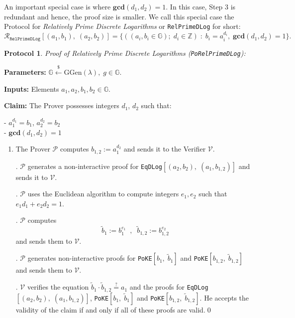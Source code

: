 \documentclass[11pt, lettersize, notitlepage, leqno, footskip=0.6cm]{article}
\newcommand{\bz}{\mathbb Z}
\newcommand{\ttt}{\texttt}
\newcommand{\wti}{\widetilde}
\newcommand{\mc}{\mathcal}
\newcommand{\mb}{\mathbb}
\newcommand{\mbf}{\mathbf}
\newcommand{\mr}{\mathrm}
\newcommand{\lamb}{\lambda}
\newcommand{\mP}{\mc{P}}
\newcommand{\V}{\mc{V}}
\newcommand{\vs}{\vspace{-0.15cm}}
\newcommand{\noin}{\noindent}
\newcommand{\GCD}{\mbf{gcd}}
\newtheorem{Prot}[Thm]{Protocol}
\numberwithin{equation}{section}
\begin{document}
\noindent An important special case is where $\GCD(d_1, d_2) = 1$. In this case, Step 3 is redundant and hence, the proof size is smaller. We call this special case the Protocol for \textit{Relatively Prime Discrete Logarithms} or \verb|RelPrimeDLog| for short: \vs $$\mc{R}_{{\ttt{RelPrimeDLog}}}[(a_1,b_1),\;(a_2,b_2)] = \big\{((a_i, b_i\in\mb{G});\;d_i\in\bz)\;:\; b_i = a_i^{d_i},\;\GCD(d_1,d_2)=1 \big\} .$$ 



\begin{Prot} \normalfont \hypertarget{RP}{\textit{Proof of Relatively Prime Discrete Logarithms}} (\verb|PoRelPrimeDLog|):\end{Prot} \vspace{-0.3cm}

\noindent \textbf{Parameters:} $\mb{G}\xleftarrow{\$} \mr{GGen}(\lamb), \; g\in \mb{G}$.

\noindent \textbf{Inputs:} Elements $a_1, a_2, b_1, b_2 \in \mb{G}$. 

\noindent \textbf{Claim:} The Prover possesses integers $d_1$, $d_2$ such that:

\noindent - $a_1^{d_1} = b_1$, $a_2^{d_2} = b_2$\\
\noindent - $\GCD(d_1, d_2) = 1$
 

\begin{enumerate}[wide, labelwidth=!, labelindent=0pt]\vs \item The Prover $\mc{P}$ computes $b_{1,2}:= a_1^{d_2}$ and sends it to the Verifier $\V$. 

. $\mP$ generates a non-interactive proof for \verb|EqDLog|$[(a_2, b_2),\; (a_1, b_{1,2})]$ and sends it to $\mc{V}$.

. $\mc{P}$ uses the Euclidean algorithm to compute integers $e_1, e_2$ such that $e_1d_1 + e_2d_2 = 1$.

\noin 4. $\mc{P}$ computes \vs $$\wti{b}_1:= b_1^{e_1}\;\;,\;\; \wti{b}_{1,2}:= b_{1,2}^{e_2} $$ and sends them to $\V$. 

\noin 5. $\mP$ generates non-interactive proofs for \verb|PoKE|$[b_1,\; \wti{b}_1]$ and \verb|PoKE|$[b_{1,2},\; \wti{b}_{1,2}]$ and sends them to $\mc{V}$.

. $\mc{V}$ verifies the equation $\wti{b}_1\cdot\wti{b}_{1,2}\stackrel{?}{=} a_1$ and the proofs for \verb|EqDLog|$[(a_2, b_2),\; (a_1, b_{1,2})]$, \verb|PoKE|$[b_1,\; \wti{b}_1]$ and \verb|PoKE|$[b_{1,2},\; \wti{b}_{1,2}]$. He accepts the validity of the claim if and only if all of these proofs are valid.\qed \end{enumerate}
\end{document}
